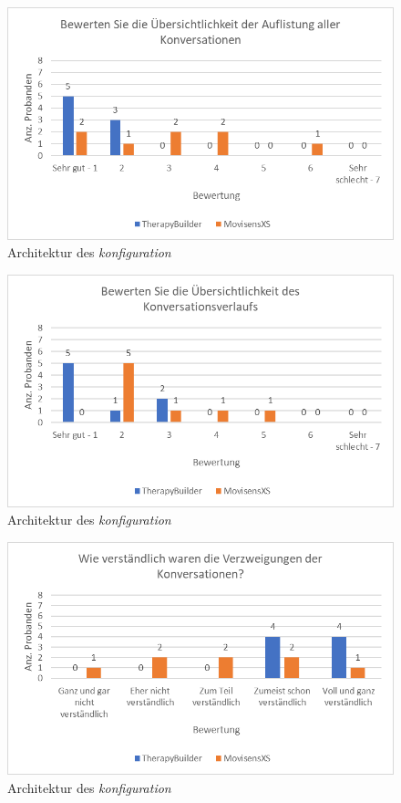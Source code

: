 \begin{figure}[h]
\centering
\includegraphics[width=1\textwidth]{pictures/diagramme/konversationenuebersicht}
\caption{Architektur des \emph{konfiguration}}
\label{therapyBuilder}
\end{figure}

\begin{figure}[h]
\centering
\includegraphics[width=1\textwidth]{pictures/diagramme/konversationverlfueber}
\caption{Architektur des \emph{konfiguration}}
\label{therapyBuilder}
\end{figure}

\begin{figure}[h]
\centering
\includegraphics[width=1\textwidth]{pictures/diagramme/konversationverzweigung}
\caption{Architektur des \emph{konfiguration}}
\label{therapyBuilder}
\end{figure}

